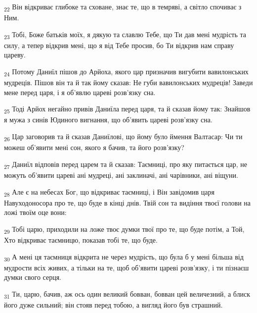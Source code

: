 \begin{tcolorbox}
\textsubscript{22} Він відкриває глибоке та сховане, знає те, що в темряві, а світло спочиває з Ним.
\end{tcolorbox}
\begin{tcolorbox}
\textsubscript{23} Тобі, Боже батьків моїх, я дякую та славлю Тебе, що Ти дав мені мудрість та силу, а тепер відкрив мені, що я від Тебе просив, бо Ти відкрив нам справу цареву.
\end{tcolorbox}
\begin{tcolorbox}
\textsubscript{24} Потому Даниїл пішов до Арйоха, якого цар призначив вигубити вавилонських мудреців. Пішов він та й так йому сказав: Не губи вавилонських мудреців! Заведи мене перед царя, і я об'явлю цареві розв'язку сна.
\end{tcolorbox}
\begin{tcolorbox}
\textsubscript{25} Тоді Арйох негайно привів Даниїла перед царя, та й сказав йому так: Знайшов я мужа з синів Юдиного вигнання, що об'явить цареві розв'язку сна.
\end{tcolorbox}
\begin{tcolorbox}
\textsubscript{26} Цар заговорив та й сказав Даниїлові, що йому було ймення Валтасар: Чи ти можеш об'явити мені сон, якого я бачив, та його розв'язку?
\end{tcolorbox}
\begin{tcolorbox}
\textsubscript{27} Даниїл відповів перед царем та й сказав: Таємниці, про яку питається цар, не можуть об'явити цареві ані мудреці, ані заклиначі, ані чарівники, ані віщуни.
\end{tcolorbox}
\begin{tcolorbox}
\textsubscript{28} Але є на небесах Бог, що відкриває таємниці, і Він завідомив царя Навуходоносора про те, що буде в кінці днів. Твій сон та видіння твоєї голови на ложі твоїм оце вони:
\end{tcolorbox}
\begin{tcolorbox}
\textsubscript{29} Тобі царю, приходили на ложе твоє думки твої про те, що буде потім, а Той, Хто відкриває таємницю, показав тобі те, що буде.
\end{tcolorbox}
\begin{tcolorbox}
\textsubscript{30} А мені ця таємниця відкрита не через мудрість, що була б у мені більша від мудрости всіх живих, а тільки на те, щоб об'явити цареві розв'язку, і ти пізнаєш думки свого серця.
\end{tcolorbox}
\begin{tcolorbox}
\textsubscript{31} Ти, царю, бачив, аж ось один великий бовван, бовван цей величезний, а блиск його дуже сильний; він стояв перед тобою, а вигляд його був страшний.
\end{tcolorbox}
